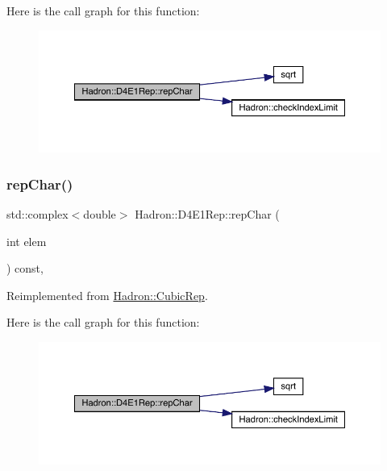 Here is the call graph for this function\+:
\nopagebreak
\begin{figure}[H]
\begin{center}
\leavevmode
\includegraphics[width=350pt]{da/d78/structHadron_1_1D4E1Rep_a5c4eb87d8e59c8653c6d4da163c300ea_cgraph}
\end{center}
\end{figure}
\mbox{\label{structHadron_1_1D4E1Rep_a5c4eb87d8e59c8653c6d4da163c300ea}} 
\subsubsection{\texorpdfstring{repChar()}{repChar()}\hspace{0.1cm}{\footnotesize\ttfamily [2/2]}}
{\footnotesize\ttfamily std\+::complex$<$double$>$ Hadron\+::\+D4\+E1\+Rep\+::rep\+Char (\begin{DoxyParamCaption}\item[{int}]{elem }\end{DoxyParamCaption}) const\hspace{0.3cm}{\ttfamily [inline]}, {\ttfamily [virtual]}}



Reimplemented from \mbox{\hyperlink{structHadron_1_1CubicRep_af45227106e8e715e84b0af69cd3b36f8}{Hadron\+::\+Cubic\+Rep}}.

Here is the call graph for this function\+:
\nopagebreak
\begin{figure}[H]
\begin{center}
\leavevmode
\includegraphics[width=350pt]{da/d78/structHadron_1_1D4E1Rep_a5c4eb87d8e59c8653c6d4da163c300ea_cgraph}
\end{center}
\end{figure}
\mbox{\label{structHadron_1_1D4E1Rep_a8a0fcfa06e2a36d6835bab2431654a2f}} 

